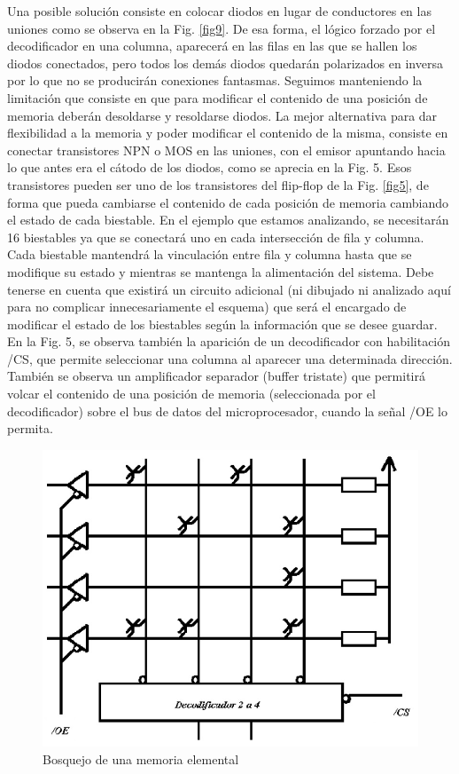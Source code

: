 \documentclass[12pt]{book}
\theoremstyle{definition}
\theoremstyle{remark}
\theoremstyle{plain}
\begin{document}
Una posible solución consiste en colocar diodos en lugar de conductores en las uniones como se observa en la Fig. \ref{fig9}. De esa forma, el  \grqq lógico forzado por el decodificador en una columna, aparecerá en las filas en las que se hallen los diodos conectados, pero todos los demás diodos quedarán polarizados en inversa por lo que no se producirán conexiones fantasmas.
Seguimos manteniendo la limitación que consiste en que para modificar el contenido de una posición de memoria deberán desoldarse y resoldarse diodos.
La mejor alternativa para dar flexibilidad a la memoria y poder modificar el contenido de la misma, consiste en conectar transistores NPN o MOS en las uniones, con el emisor apuntando hacia lo que antes era el cátodo de los diodos, como se aprecia en la Fig. 5. Esos transistores pueden ser uno de los transistores del flip-flop de la Fig. \ref{fig5}, de forma que pueda cambiarse el contenido de cada posición de memoria cambiando el estado de cada biestable.
En el ejemplo que estamos analizando, se necesitarán 16 biestables ya que se conectará uno en cada intersección de fila y columna. Cada biestable mantendrá la vinculación entre fila y columna hasta que se modifique su estado y mientras se mantenga la alimentación del sistema.
Debe tenerse en cuenta que existirá un circuito adicional (ni dibujado ni analizado aquí para no complicar innecesariamente el esquema) que será el encargado de modificar el estado de los biestables según la información que se desee guardar.
En la Fig. 5, se observa también la aparición de un decodificador con habilitación /CS, que permite seleccionar una columna al aparecer una determinada dirección. También se observa un amplificador separador (buffer tristate) que permitirá volcar el contenido de una posición de memoria (seleccionada por el decodificador) sobre el bus de datos del microprocesador, cuando la señal /OE lo permita.

\begin{figure}
\centering
\includegraphics[width=5in]{entrada4.jpg}
\caption{Bosquejo de una memoria elemental}
\label{fig10}
\end{figure}
\end{document}

